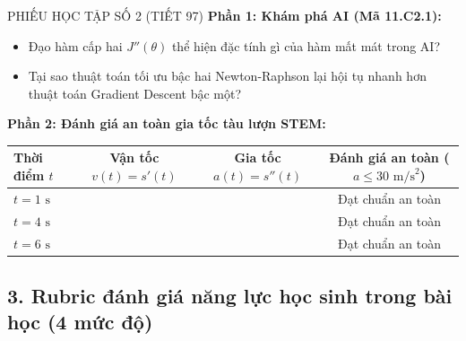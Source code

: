 \documentclass[12pt, a4paper]{article}
\begin{document}
\begin{pedabox}{PHIẾU HỌC TẬP SỐ 2 (TIẾT 97)}
\textbf{Phần 1: Khám phá AI (Mã 11.C2.1):}
\begin{itemize}
    \item Đạo hàm cấp hai $J''(\theta)$ thể hiện đặc tính gì của hàm mất mát trong AI? \dotfill
    \item Tại sao thuật toán tối ưu bậc hai Newton-Raphson lại hội tụ nhanh hơn thuật toán Gradient Descent bậc một? \dotfill
\end{itemize}

\textbf{Phần 2: Đánh giá an toàn gia tốc tàu lượn STEM:}
\begin{center}
\begin{tabularx}{\linewidth}{|l|c|c|c|}
\hline
\textbf{Thời điểm $t$} & \textbf{Vận tốc $v(t) = s'(t)$} & \textbf{Gia tốc $a(t) = s''(t)$} & \textbf{Đánh giá an toàn ($a \le 30\text{ m/s}^2$)} \\ \hline
$t = 1\text{ s}$ & & & Đạt chuẩn an toàn \\ \hline
$t = 4\text{ s}$ & & & Đạt chuẩn an toàn \\ \hline
$t = 6\text{ s}$ & & & Đạt chuẩn an toàn \\ \hline
\end{tabularx}
\end{center}
\end{pedabox}

\subsection*{3. Rubric đánh giá năng lực học sinh trong bài học (4 mức độ)}
\end{document}
